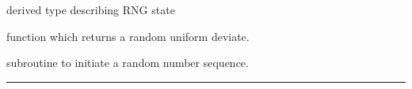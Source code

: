 \begin{related}
  \begin{sulist}{} %
  \item[\htmlref{planck\_rng}{sub:planck_rng}] derived type describing RNG state
  \item[\htmlref{rand\_uni}{sub:rand_uni}] function which returns a random uniform deviate.
   \item[\htmlref{rand\_init}{sub:rand_init}] subroutine to initiate a random number sequence. 
  \end{sulist}
\end{related}

\rule{\hsize}{2mm}

\newpage
